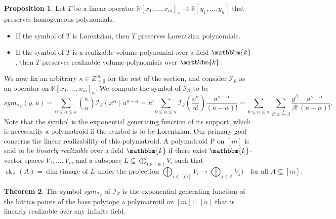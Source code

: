\documentclass{amsart}
\newcommand{\RR}{\mathbb R}
\newcommand{\ZZ}{\mathbb Z}
\newcommand{\kk}{\mathbbm{k}}
\renewcommand{\P}{\mathrm{P}}
\theoremstyle{plain}
\theoremstyle{definition}
\newtheorem{thm}{Theorem}[section]
\newtheorem{prop}[thm]{Proposition}
\begin{document}
\begin{prop}\label{prop:symbol}
Let $T$ be a linear operator $\RR[x_1, \dotsc, x_m]_\kappa\to \RR[y_1, \dotsc, y_n]$ that preserves homogeneous polynomials.
\begin{itemize}
\item \cite[Theorem~3.2]{BH20} If the symbol of $T$ is Lorentzian, then $T$ preserves Lorentzian polynomials.
\item \cite[Theorem~1.12]{GHMSW2025volpres} If the symbol of $T$ is a realizable volume polynomial over a field $\kk$, then $T$ preserves realizable volume polynomials over $\kk$.
\end{itemize}
\end{prop}

We now fix an arbitrary $\kappa \in \ZZ_{\geq 0}^m$ for the rest of the section, and consider $\mathcal I_{\mathcal S}$ as an operator on $\RR[x_1, \dotsc, x_m]_\kappa$.
We compute the symbol of $\mathcal I_{\mathcal S}$ to be
\[
sym_{\mathcal I_{\mathcal S}}(y,u) = \sum_{0\leq \alpha\leq  \kappa} \binom{\kappa}{\alpha}\mathcal I_{\mathcal S}(x^\alpha) u^{\kappa - \alpha}
= \kappa! \sum_{0\leq \alpha\leq \kappa} \mathcal I_{\mathcal S}\left(\frac{x^\alpha}{\alpha!}\right) \frac{u^{\kappa-\alpha}}{(\kappa-\alpha)!}
= \sum_{0\leq \alpha \leq \kappa} \sum_{\beta: \alpha\overset{\mathcal S}\longleftrightarrow\beta} \frac{y^\beta}{\beta!}\frac{u^{\kappa-\alpha}}{(\kappa-\alpha)!}.
\]
Note that the symbol is the exponential generating function of its support, which is necessarily a polymatroid if the symbol is to be Lorentzian.
Our primary goal concerns the linear realizability of this polymatroid.
A polymatroid $\P$ on $[m]$ is said to be \emph{linearly realizable} over a field $\kk$ if there exist $\kk$-vector spaces $V_1, \dotsc, V_m$ and a subspace $L \subseteq \bigoplus_{i\in [m]} V_i$ such that
\[
\operatorname{rk}_\P(A) = \dim \Big(\text{image of $L$ under the projection $\bigoplus_{i\in [m]} V_i \to \bigoplus_{j\in A} V_j$}\Big) \quad\text{for all $A\subseteq [m]$}.
\]


\begin{thm}\label{thm:symbol}
The symbol $sym_{\mathcal I_{\mathcal S}}$ of $\mathcal I_{\mathcal S}$ is the exponential generating function of the lattice points of the base polytope a polymatroid on $[m]\sqcup [n]$ that is linearly realizable over any infinite field.
\end{thm}
\end{document}
